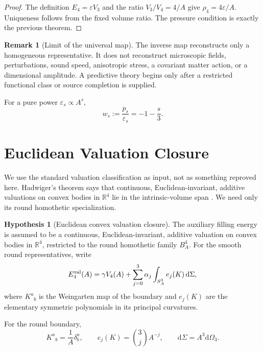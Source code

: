 \documentclass[aps,prd,reprint,onecolumn,nofootinbib,superscriptaddress,showkeys]{revtex4-2}
\numberwithin{equation}{section}
\theoremstyle{definition}
\newtheorem{hypothesis}{Hypothesis}[section]
\newtheorem{remark}{Remark}[section]
\theoremstyle{plain}
\newcommand{\Sthree}{S^3}
\newcommand{\Bfour}{B^4}
\newcommand{\R}{\mathbb R}
\newcommand{\dd}{\mathrm d}
\begin{document}
\begin{proof}
The definition \(E_4=\varepsilon V_3\) and the ratio \(V_3/V_4=4/A\) give \(\rho_4=4\varepsilon/A\).  Uniqueness follows from the fixed volume ratio.  The pressure condition is exactly the previous theorem.
\end{proof}

\begin{remark}[Limit of the universal map]
The inverse map reconstructs only a homogeneous representative.  It does not reconstruct microscopic fields, perturbations, sound speed, anisotropic stress, a covariant matter action, or a dimensional amplitude.  A predictive theory begins only after a restricted functional class or source completion is supplied.
\end{remark}

For a pure power \(\varepsilon_s\propto A^s\),
\begin{equation}
w_s:=\frac{p_s}{\varepsilon_s}
=-1-\frac s3.
\end{equation}

\section{Euclidean Valuation Closure}

We use the standard valuation classification as input, not as something reproved here.  Hadwiger's theorem says that continuous, Euclidean-invariant, additive valuations on convex bodies in \(\R^4\) lie in the intrinsic-volume span \cite{Hadwiger1957,Schneider2014}.  We need only its round homothetic specialization.

\begin{hypothesis}[Euclidean convex valuation closure]
The auxiliary filling energy is assumed to be a continuous, Euclidean-invariant, additive valuation on convex bodies in \(\R^4\), restricted to the round homothetic family \(\Bfour_A\).  For the smooth round representatives, write
\begin{equation}
E_4^{\rm val}(A)
=
\gamma V_4(A)
+\sum_{j=0}^3\alpha_j
\int_{\Sthree_A}e_j(K)\,\dd\Sigma,
\end{equation}
where \(K^a{}_b\) is the Weingarten map of the boundary and \(e_j(K)\) are the elementary symmetric polynomials in its principal curvatures.
\end{hypothesis}

For the round boundary,
\begin{equation}
K^a{}_b=\frac1A\delta^a_b,
\qquad
e_j(K)=\binom3jA^{-j},
\qquad
\dd\Sigma=A^3\dd\Omega_3.
\end{equation}
\end{document}
